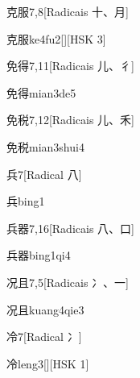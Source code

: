 \begin{entry}{克服}{7,8}[Radicais ⼗、⽉]
  \begin{phonetics}{克服}{ke4fu2}[][HSK 3]
  \end{phonetics}
\end{entry}

\begin{entry}{免得}{7,11}[Radicais ⼉、⼻]
  \begin{phonetics}{免得}{mian3de5}
  \end{phonetics}
\end{entry}

\begin{entry}{免税}{7,12}[Radicais ⼉、⽲]
  \begin{phonetics}{免税}{mian3shui4}
  \end{phonetics}
\end{entry}

\begin{entry}{兵}{7}[Radical ⼋]
  \begin{phonetics}{兵}{bing1}
  \end{phonetics}
\end{entry}

\begin{entry}{兵器}{7,16}[Radicais ⼋、⼝]
  \begin{phonetics}{兵器}{bing1qi4}
  \end{phonetics}
\end{entry}

\begin{entry}{况且}{7,5}[Radicais ⼎、⼀]
  \begin{phonetics}{况且}{kuang4qie3}
  \end{phonetics}
\end{entry}

\begin{entry}{冷}{7}[Radical ⼎]
  \begin{phonetics}{冷}{leng3}[][HSK 1]
  \end{phonetics}
\end{entry}

